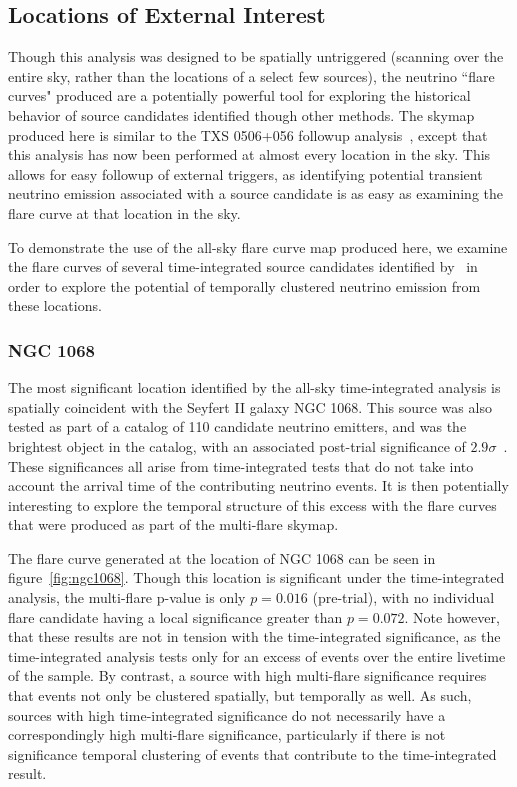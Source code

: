 \subsection{Locations of External Interest}
Though this analysis was designed to be spatially untriggered (scanning over the entire sky, rather than the locations of a select few sources), the neutrino ``flare curves" produced are a potentially powerful tool for exploring the historical behavior of source candidates identified though other methods. The skymap produced here is similar to the TXS 0506+056 followup analysis~\cite{TXS_Archival}, except that this analysis has now been performed at almost every location in the sky. This allows for easy followup of external triggers, as identifying potential transient neutrino emission associated with a source candidate is as easy as examining the flare curve at that location in the sky. 

To demonstrate the use of the all-sky flare curve map produced here, we examine the flare curves of several time-integrated source candidates identified by~\cite{10yr_tint} in order to explore the potential of temporally clustered neutrino emission from these locations. 

\subsubsection{NGC 1068}

The most significant location identified by the all-sky time-integrated analysis is spatially coincident with the Seyfert II galaxy NGC 1068. This source was also tested as part of a catalog of 110 candidate neutrino emitters, and was the brightest object in the catalog, with an associated post-trial significance of $2.9 \sigma$~\cite{10yr_tint}. These significances all arise from time-integrated tests that do not take into account the arrival time of the contributing neutrino events. It is then potentially interesting to explore the temporal structure of this excess with the flare curves that were produced as part of the multi-flare skymap. 

The flare curve generated at the location of NGC 1068 can be seen in figure~\ref{fig:ngc1068}. Though this location is significant under the time-integrated analysis, the multi-flare p-value is only $p=0.016$ (pre-trial), with no individual flare candidate having a local significance greater than $p=0.072$. Note however, that these results are not in tension with the time-integrated significance, as the time-integrated analysis tests only for an excess of events over the entire livetime of the sample. By contrast, a source with high multi-flare significance requires that events not only be clustered spatially, but temporally as well. As such, sources with high time-integrated significance do not necessarily have a correspondingly high multi-flare significance, particularly if there is not significance temporal clustering of events that contribute to the time-integrated result. 

